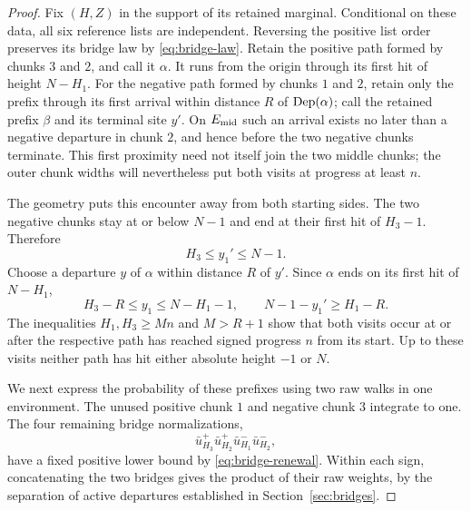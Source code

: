\begin{proof}
Fix \((H,Z)\) in the support of its retained marginal.  Conditional on
these data, all six reference lists are independent.  Reversing the
positive list order preserves its bridge law by
\eqref{eq:bridge-law}.  Retain the positive path formed by chunks \(3\)
and \(2\), and call it \(\alpha\).  It runs from the origin through its
first hit of height \(N-H_1\).  For the negative path formed by chunks
\(1\) and \(2\), retain only the prefix through its first arrival within
distance \(R\) of \(\operatorname{Dep}(\alpha)\); call the retained prefix \(\beta\)
and its terminal site \(y'\).  On \(E_{\rm mid}\) such an arrival exists
no later than a negative departure in chunk \(2\), and hence before the
two negative chunks terminate.
This first proximity need not itself join the two middle chunks; the
outer chunk widths will nevertheless put both visits at progress at
least \(n\).

The geometry puts this encounter away from both starting sides.  The two
negative chunks stay at or below \(N-1\) and end at their first hit of
\(H_3-1\).  Therefore
\[
 H_3\le y_1'\le N-1.
\]
Choose a departure \(y\) of \(\alpha\) within distance \(R\) of \(y'\).
Since \(\alpha\) ends on its first hit of \(N-H_1\),
\begin{equation}
 H_3-R\le y_1\le N-H_1-1,
 \qquad N-1-y_1'\ge H_1-R.
 \label{eq:reference-contact-heights}
\end{equation}
The inequalities \(H_1,H_3\ge Mn\) and \(M>R+1\) show that both visits
occur at or after the respective path has reached signed progress \(n\)
from its start.  Up to these visits neither path has hit either absolute
height \(-1\) or \(N\).

We next express the probability of these prefixes using two raw walks in
one environment.  The unused positive chunk \(1\) and negative chunk
\(3\) integrate to one.  The four remaining bridge normalizations,
\[
 \bar u_{H_3}^+\bar u_{H_2}^+
 \bar u_{H_1}^-\bar u_{H_2}^-,
\]
have a fixed positive lower bound by \eqref{eq:bridge-renewal}.  Within
each sign, concatenating the two bridges gives the product of their raw
weights, by the separation of active departures established in
Section~\ref{sec:bridges}.


\end{proof}
